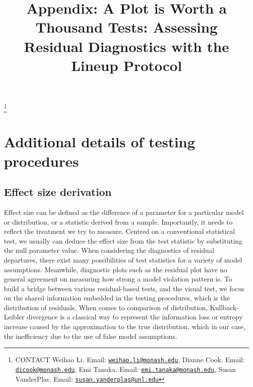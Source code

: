 \documentclass[]{interact}
\theoremstyle{plain}%
\theoremstyle{definition}
\theoremstyle{remark}
\begin{document}
\articletype{}

\title{Appendix: A Plot is Worth a Thousand Tests: Assessing Residual
Diagnostics with the Lineup Protocol}


\author{
}

\thanks{CONTACT Weihao
Li. Email: \href{mailto:weihao.li@monash.edu}{\nolinkurl{weihao.li@monash.edu}}, Dianne
Cook. Email: \href{mailto:dicook@monash.edu}{\nolinkurl{dicook@monash.edu}}, Emi
Tanaka. Email: \href{mailto:emi.tanaka@monash.edu}{\nolinkurl{emi.tanaka@monash.edu}}, Susan
VanderPlas. Email: \href{mailto:susan.vanderplas@unl.edu}{\nolinkurl{susan.vanderplas@unl.edu}}}

\maketitle



\appendix

\hypertarget{additional-details-of-testing-procedures}{%
\section{Additional details of testing
procedures}\label{additional-details-of-testing-procedures}}

\hypertarget{effect-size-derivation}{%
\subsection{Effect size derivation}\label{effect-size-derivation}}

Effect size can be defined as the difference of a parameter for a
particular model or distribution, or a statistic derived from a sample.
Importantly, it needs to reflect the treatment we try to measure.
Centred on a conventional statistical test, we usually can deduce the
effect size from the test statistic by substituting the null parameter
value. When considering the diagnostics of residual departures, there
exist many possibilities of test statistics for a variety of model
assumptions. Meanwhile, diagnostic plots such as the residual plot have
no general agreement on measuring how strong a model violation pattern
is. To build a bridge between various residual-based tests, and the
visual test, we focus on the shared information embedded in the testing
procedures, which is the distribution of residuals. When comes to
comparison of distribution, Kullback-Leibler divergence
\citep{kullback1951information} is a classical way to represent the
information loss or entropy increase caused by the approximation to the
true distribution, which in our case, the inefficiency due to the use of
false model assumptions.
\end{document}
